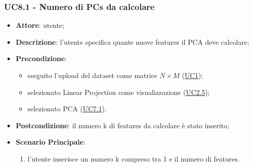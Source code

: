    \subsubsection{UC8.1 - Numero di PCs da calcolare}
    \label{uc8.1}
    \begin{itemize}
    \item \textbf{Attore}: utente;
    \item \textbf{Descrizione}: l'utente specifica quante nuove features il PCA deve calcolare;
    \item \textbf{Precondizione}: 
    \begin{itemize}
        \item eseguito l'upload del dataset come matrice $N\times M$ (\hyperref[uc1]{UC1});
        \item selezionato Linear Projection come visualizzazione (\hyperref[uc2.5]{UC2.5});
        \item selezionato PCA (\hyperref[uc7.1]{UC7.1}).
    \end{itemize}  
    \item \textbf{Postcondizione}: il numero k di features da calcolare è stato inserito;
    \item \textbf{Scenario Principale}: 
    \begin{enumerate}
        \item l'utente inserisce un numero k compreso tra 1 e il numero di features.
    \end{enumerate}  
    \end{itemize}